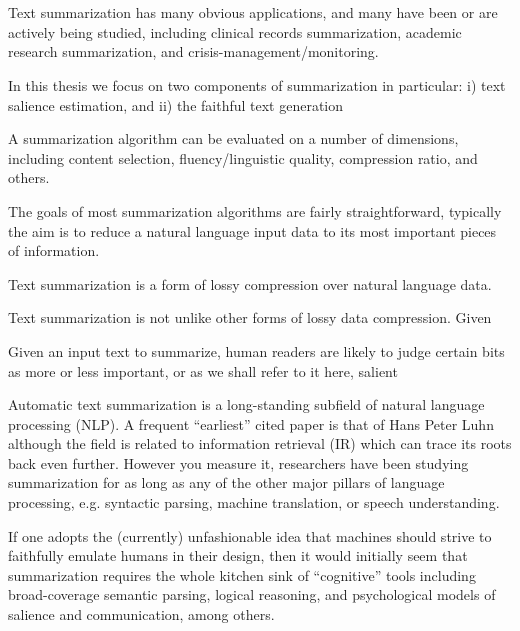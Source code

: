 ~\\
~\\






Text summarization has many obvious applications, and many have been or are 
actively being studied, including clinical records summarization, academic 
research summarization, and crisis-management/monitoring.






In this thesis we focus on two components of summarization 
in particular: i) text salience estimation, and ii) the faithful 
text generation



A summarization algorithm can be evaluated on a number of dimensions,
including content selection, fluency/linguistic quality, compression ratio,
and others. 









The goals of most summarization 
algorithms are fairly straightforward, typically the aim is to
reduce a natural language input data to its most important pieces of 
information. 




Text summarization is a form of lossy compression over natural language data.






Text summarization is not unlike other forms of lossy data compression.
Given 

Given an input text to summarize, human readers are likely to judge 
certain bits as more or less important, or as we shall refer to it here, 
salient





Automatic text summarization is a long-standing subfield of natural language
processing (NLP). A frequent ``earliest'' cited paper is that of Hans Peter 
Luhn \cite{luhn1958automatic} although the field is related to information
retrieval (IR) which can trace its roots back even further. However you
measure it, researchers have been studying summarization for as long
as any of the other major pillars of language processing, e.g. syntactic
parsing, machine translation, or speech understanding. 

If one adopts the (currently) unfashionable idea that machines should 
strive to faithfully emulate humans in their design, then it would initially
seem that summarization requires the whole kitchen sink of ``cognitive''
tools including broad-coverage semantic parsing, logical reasoning, 
and psychological models of salience and communication, among others.

